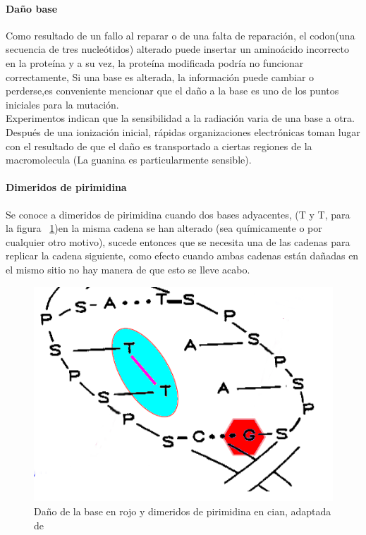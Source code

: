\paragraph{Daño base}

Como resultado de un fallo al reparar o de una falta de reparación, el codon(una secuencia de tres nucleótidos) alterado puede insertar un aminoácido incorrecto en la proteína y a su vez, la proteína modificada podría no funcionar correctamente, Si una base es alterada, la información puede cambiar o perderse,es conveniente mencionar que el daño a la base es uno de los puntos iniciales para la mutación. \\
Experimentos indican que la sensibilidad a la radiación varia de una base a otra. Después de una ionización inicial, rápidas organizaciones electrónicas toman lugar con el resultado de que el daño es transportado a ciertas regiones de la macromolecula (La guanina es particularmente sensible)\cite{Thormod}.

\paragraph{Dimeridos de pirimidina}

Se conoce a dimeridos de pirimidina cuando dos bases adyacentes, (T y T, para la figura ~\ref{fig:dbdi})en la misma cadena se han alterado (sea químicamente o por cualquier otro motivo),  sucede entonces  que se necesita una de las cadenas para replicar la cadena siguiente, como efecto cuando ambas cadenas están dañadas en el mismo sitio no hay manera de que esto se lleve acabo.

\begin{figure}[htbp]
    \centering
    \includegraphics[width=0.5\linewidth]{./Figures/base-piri.png}
    \caption[Esquema Daño base y Dimeridos]{ Daño de la base en rojo y dimeridos de pirimidina en cian, adaptada de \cite{Thormod}}
    \label{fig:dbdi}
\end{figure}

